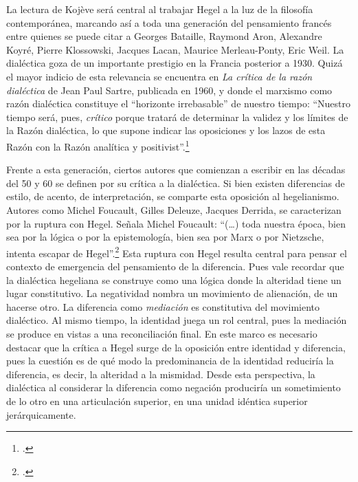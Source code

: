 \documentclass{book}
\begin{document}
La lectura de Kojève será central al trabajar Hegel a la luz de la
filosofía contemporánea, marcando así a toda una generación del
pensamiento francés entre quienes se puede citar a Georges Bataille,
Raymond Aron, Alexandre Koyré, Pierre Klossowski, Jacques Lacan, Maurice
Merleau-Ponty, Eric Weil. La dialéctica goza de un importante prestigio
en la Francia posterior a 1930. Quizá el mayor indicio de esta
relevancia se encuentra en \emph{La crítica de la razón dialéctica} de
Jean Paul Sartre, publicada en 1960, y donde el marxismo como razón
dialéctica constituye el \enquote{horizonte irrebasable} de nuestro tiempo:
\enquote{Nuestro tiempo será, pues, \emph{crítico} porque tratará de determinar
la validez y los límites de la Razón dialéctica, lo que supone indicar
las oposiciones y los lazos de esta Razón con la Razón analítica y
positivist}.\footcite[11]{sartre1995}

Frente a esta generación, ciertos autores que comienzan a escribir en
las décadas del 50 y 60 se definen por su crítica a la dialéctica. Si
bien existen diferencias de estilo, de acento, de interpretación, se
comparte esta oposición al hegelianismo. Autores como Michel Foucault,
Gilles Deleuze, Jacques Derrida, se caracterizan por la ruptura con
Hegel. Señala Michel Foucault: \enquote{(\dots) toda nuestra época, bien
sea por la lógica o por la epistemología, bien sea por Marx o por
Nietzsche, intenta escapar de Hegel}.\footcite[59]{foucault1973} Esta ruptura
con Hegel resulta central para pensar el contexto de emergencia del
pensamiento de la diferencia. Pues vale recordar que la dialéctica
hegeliana se construye como una lógica donde la alteridad tiene un lugar
constitutivo. La negatividad nombra un movimiento de alienación, de un
hacerse otro. La diferencia como \emph{mediación} es constitutiva del
movimiento dialéctico. Al mismo tiempo, la identidad juega un rol
central, pues la mediación se produce en vistas a una reconciliación
final. En este marco es necesario destacar que la crítica a Hegel surge
de la oposición entre identidad y diferencia, pues la cuestión es de qué
modo la predominancia de la identidad reduciría la diferencia, es decir,
la alteridad a la mismidad. Desde esta perspectiva, la dialéctica al
considerar la diferencia como negación produciría un sometimiento de lo
otro en una articulación superior, en una unidad idéntica superior
jerárquicamente.
\end{document}
